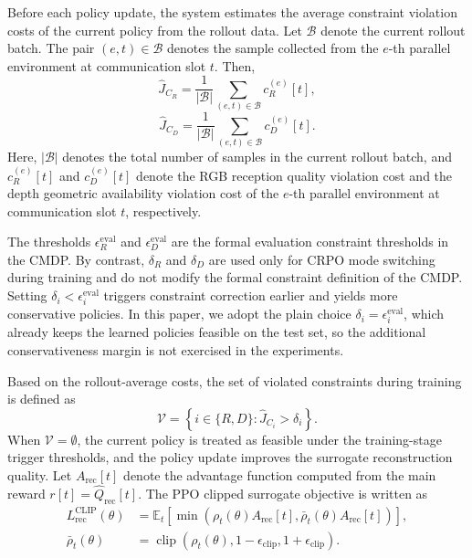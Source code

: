 \documentclass[journal]{IEEEtran}
\begin{document}
Before each policy update, the system estimates the average constraint violation costs of the current policy from the rollout data. Let $\mathcal{B}$ denote the current rollout batch. The pair $(e,t)\in\mathcal{B}$ denotes the sample collected from the $e$-th parallel environment at communication slot $t$. Then,
\begin{equation}
\hat{J}_{C_R}
=
\frac{1}{|\mathcal{B}|}
\sum_{(e,t)\in\mathcal{B}}
c_R^{(e)}[t],
\end{equation}
\begin{equation}
\hat{J}_{C_D}
=
\frac{1}{|\mathcal{B}|}
\sum_{(e,t)\in\mathcal{B}}
c_D^{(e)}[t].
\end{equation}
Here, $|\mathcal{B}|$ denotes the total number of samples in the current rollout batch, and $c_R^{(e)}[t]$ and $c_D^{(e)}[t]$ denote the RGB reception quality violation cost and the depth geometric availability violation cost of the $e$-th parallel environment at communication slot $t$, respectively.

The thresholds $\epsilon_R^{\mathrm{eval}}$ and $\epsilon_D^{\mathrm{eval}}$ are the formal evaluation constraint thresholds in the CMDP. By contrast, $\delta_R$ and $\delta_D$ are used only for CRPO mode switching during training and do not modify the formal constraint definition of the CMDP. Setting $\delta_i<\epsilon_i^{\mathrm{eval}}$ triggers constraint correction earlier and yields more conservative policies. In this paper, we adopt the plain choice $\delta_i=\epsilon_i^{\mathrm{eval}}$, which already keeps the learned policies feasible on the test set, so the additional conservativeness margin is not exercised in the experiments.

Based on the rollout-average costs, the set of violated constraints during training is defined as
\begin{equation}
\mathcal{V}
=
\left\{
i\in\{R,D\}:
\hat{J}_{C_i}>\delta_i
\right\}.
\end{equation}
When $\mathcal{V}=\emptyset$, the current policy is treated as feasible under the training-stage trigger thresholds, and the policy update improves the surrogate reconstruction quality. Let $A_{\mathrm{rec}}[t]$ denote the advantage function computed from the main reward $r[t]=\hat{Q}_{\mathrm{rec}}[t]$. The PPO clipped surrogate objective is written as
\begin{equation}
\begin{aligned}
L_{\mathrm{rec}}^{\mathrm{CLIP}}(\theta)
&=
\mathbb{E}_{t}
\left[
\min
\left(
\rho_t(\theta) A_{\mathrm{rec}}[t],
\bar{\rho}_t(\theta) A_{\mathrm{rec}}[t]
\right)
\right], \\
\bar{\rho}_t(\theta)
&=
\operatorname{clip}
\left(
\rho_t(\theta),
1-\epsilon_{\mathrm{clip}},
1+\epsilon_{\mathrm{clip}}
\right).
\end{aligned}
\label{eq:ppo_rec_objective}
\end{equation}
\end{document}
